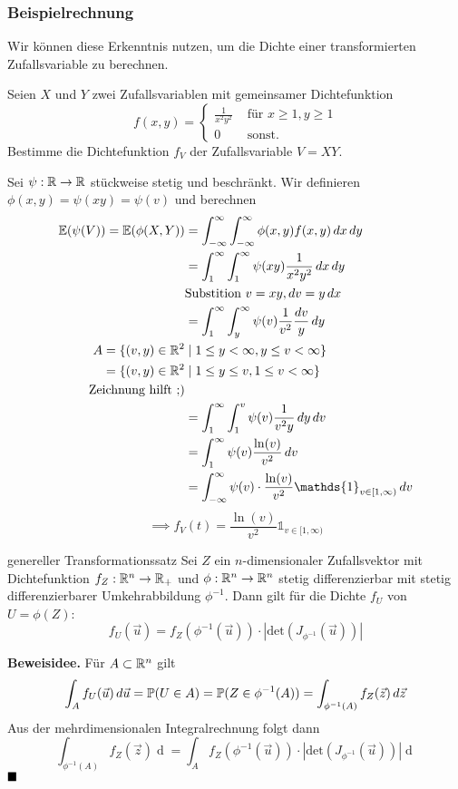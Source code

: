 \subsubsection*{Beispielrechnung}

Wir können diese Erkenntnis nutzen, um die Dichte einer transformierten Zufallsvariable zu berechnen.

Seien $X$ und $Y$ zwei Zufallsvariablen mit gemeinsamer Dichtefunktion
$$f(x,y) = \begin{cases}
    \frac{1}{x^2y^2} & \text{ für } x \geq 1, y \geq 1\\
    0 & \text{ sonst.}
\end{cases}$$
Bestimme die Dichtefunktion $f_V$ der Zufallsvariable $V = XY$.

Sei $\psi: \R \to \R$ stückweise stetig und beschränkt.
Wir definieren $\phi(x, y) = \psi(xy) = \psi(v)$ und berechnen 
\begin{align*}
    \E(\psi(V)) = \E(\phi(X,Y)) &= \int_{-\infty}^{\infty}\int_{-\infty}^{\infty}\phi(x,y)f(x,y)\dx\mathop{dy}\\
    &= \int_{1}^{\infty}\int_{1}^{\infty}\psi(xy)\frac{1}{x^2y^2}\dx\mathop{dy}\\
    &\text{Substition } v = xy, \mathop{dv} = y\mathop{dx}\\
    &= \int_{1}^{\infty}\int_{y}^{\infty}\psi(v)\frac{1}{v^2}\frac{\mathop{dv}}{y}\mathop{dy}\\
    A = \{(v, y) \in \R^2 &\mid 1 \leq y < \infty, y \leq v < \infty\}\\
    = \{(v, y) \in \R^2 &\mid 1 \leq y \leq v, 1 \leq v < \infty\}\\
    \text{Zeichnung hilft ;)}\\
    &= \int_{1}^{\infty}\int_{1}^{v}\psi(v)\frac{1}{v^2y}\mathop{dy}\mathop{dv}\\
    &= \int_{1}^{\infty}\psi(v)\frac{\ln(v)}{v^2}\mathop{dv}\\
    &= \int_{-\infty}^{\infty}\psi(v) \cdot \frac{\ln(v)}{v^2}\mathds{1}_{v \in [1,\infty)}\mathop{dv}
\end{align*}
$$\implies f_V(t) = \frac{\ln(v)}{v^2}\mathds{1}_{v \in [1,\infty)}$$

\begin{mainbox}{genereller Transformationssatz}
    Sei $Z$ ein $n$-dimensionaler Zufallsvektor mit Dichtefunktion $f_Z: \R^n \to \R_+$ und $\phi: \R^n \to \R^n$ stetig differenzierbar mit stetig differenzierbarer Umkehrabbildung $\phi^{-1}$. Dann gilt für die Dichte $f_U$ von $U = \phi(Z)$:
    \[f_U(\vec{u}) = f_Z\left(\phi^{-1}\left(\vec{u}\right)\right) \cdot |\text{det}(J_{\phi^{-1}}(\vec{u}))|\]
\end{mainbox}
\textbf{Beweisidee.} Für $A \subset \R^n$ gilt
\[\int_{A}f_U(\vec{u})\mathop{d\vec{u}} = \P(U \in A) = \P(Z \in \phi^{-1}(A)) = \int_{\phi^{-1}(A)}f_Z(\vec{z})\mathop{d\vec{z}}\]
Aus der mehrdimensionalen Integralrechnung folgt dann
\[\int_{\phi^{-1}(A)}f_Z(\vec{z})\mathop{d\vec{z}} = \int_{A}f_Z\left(\phi^{-1}\left(\vec{u}\right)\right) \cdot |\text{det}(J_{\phi^{-1}}(\vec{u}))|\mathop{d\vec{u}}\]
$\hfill\blacksquare$
